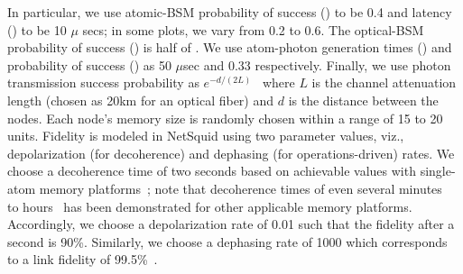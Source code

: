 In particular, we use atomic-BSM probability of success (\bp) 
to be 0.4 and latency (\bt) to be 10 $\mu$ secs; in some plots, we vary \bp from 
0.2 to 0.6. The optical-BSM probability of success (\php) is half of \bp. 
We use atom-photon generation times (\gt) and probability of success
(\gp) as 50 $\mu$sec and 0.33 respectively. Finally, we use photon 
transmission success probability 
as $e^{-d/(2L)}$~\cite{caleffi} where $L$ is the channel attenuation length
(chosen as 20km for an optical fiber) and $d$ is the distance between the nodes.
Each node's memory size is randomly chosen within a range of 15 to 20 units.
Fidelity is modeled in NetSquid using two parameter values, viz., depolarization
(for decoherence) and dephasing (for operations-driven) rates. 
We choose a decoherence time of two seconds based on achievable
values with single-atom memory platforms~\cite{loock20}; 
note that decoherence times of even several 
minutes~\cite{dec-13,dec-14} to hours~\cite{dec-15,dec-2021} has been 
demonstrated for other applicable memory platforms. 
Accordingly, we choose a depolarization rate of 0.01 such that the 
fidelity after a second is 90\%.
Similarly, we choose a dephasing rate of 1000 which corresponds to a link \eps 
fidelity of 99.5\%~\cite{delft-lp}.





